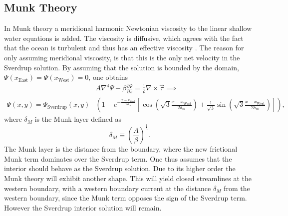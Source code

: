 \subsection{Munk Theory}
In Munk theory a meridional harmonic Newtonian viscosity to the linear shallow water equations is added. The viscosity is diffusive, which agrees with the fact that the ocean is turbulent and thus has an effective viscosity \citep{Vallis06}. The reason for only assuming meridional viscosity, is that this is the only net velocity in the Sverdrup solution. By assuming that the solution is bounded by the domain, $\Psi(x_\text{East})=\Psi(x_\text{West})=0$, one obtains
\begin{align}
    &A\nabla^4 \Psi -\beta \frac{\partial \Psi}{\partial x} = \frac{1}{\rho}\nabla\times\vec{\tau} \implies \\
    \Psi(x,y)=\Psi_\text{Sverdrup}(x,y)&\left(1-e^{-\frac{x-x_\text{West}}{2\delta_m}}\left[\cos\left(\sqrt{3}\frac{x-x_\text{West}}{2\delta_m}\right)+\frac{1}{\sqrt{3}}\sin\left(\sqrt{3}\frac{x-x_\text{West}}{2\delta_m}\right)\right]\right),
\end{align}
where $\delta_M$ is the Munk layer defined as 
\begin{equation}
    \delta_M\equiv\left(\frac{A}{\beta}\right)^{\tfrac{1}{3}}.
\end{equation}
The Munk layer is the distance from the boundary, where the new frictional Munk term dominates over the Sverdrup term. One thus assumes that the interior should behave as the Sverdrup solution. Due to its higher order the Munk theory will exhibit another shape. This will yield closed streamlines at the western boundary, with a western boundary current at the distance $\delta_M$ from the western boundary, since the Munk term opposes the sign of the Sverdrup term. However the Sverdrup interior solution will remain. 


